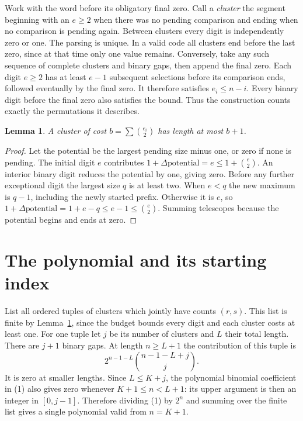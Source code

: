 \documentclass[11pt,letterpaper]{article}
\newtheorem{lemma}[theorem]{Lemma}
\begin{document}
Work with the word before its obligatory final zero. Call a \emph{cluster} the segment beginning with an $e\ge2$ when there was no pending comparison and ending when no comparison is pending again. Between clusters every digit is independently zero or one. The parsing is unique. In a valid code all clusters end before the last zero, since at that time only one value remains. Conversely, take any such sequence of complete clusters and binary gaps, then append the final zero. Each digit $e\ge2$ has at least $e-1$ subsequent selections before its comparison ends, followed eventually by the final zero. It therefore satisfies $e_i\le n-i$. Every binary digit before the final zero also satisfies the bound. Thus the construction counts exactly the permutations it describes.

\begin{lemma}\label{len}
A cluster of cost $b=\sum\binom{e_i}{2}$ has length at most $b+1$.
\end{lemma}
\begin{proof}
Let the potential be the largest pending size minus one, or zero if none is pending. The initial digit $e$ contributes $1+\Delta\text{potential}=e\le1+\binom e2$. An interior binary digit reduces the potential by one, giving zero. Before any further exceptional digit the largest size $q$ is at least two. When $e<q$ the new maximum is $q-1$, including the newly started prefix. Otherwise it is $e$, so $1+\Delta\text{potential}=1+e-q\le e-1\le\binom e2$. Summing telescopes because the potential begins and ends at zero.
\end{proof}

\section{The polynomial and its starting index}
List all ordered tuples of clusters which jointly have counts $(r,s)$. This list is finite by Lemma~\ref{len}, since the budget bounds every digit and each cluster costs at least one. For one tuple let $j$ be its number of clusters and $L$ their total length. There are $j+1$ binary gaps. At length $n\ge L+1$ the contribution of this tuple is
\[
 2^{n-1-L}\binom{n-1-L+j}{j}. \tag{1}
\]
It is zero at smaller lengths. Since $L\le K+j$, the polynomial binomial coefficient in (1) also gives zero whenever $K+1\le n<L+1$: its upper argument is then an integer in $[0,j-1]$. Therefore dividing (1) by $2^n$ and summing over the finite list gives a single polynomial valid from $n=K+1$.
\end{document}
